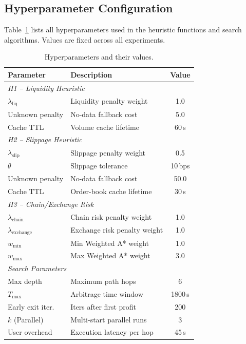 \subsection{Hyperparameter Configuration}
\label{sec:hyperparams}

Table~\ref{tab:hyperparams} lists all hyperparameters used in the heuristic functions and search algorithms. Values are fixed across all experiments.

\begin{table}[h]
\centering
\small
\caption{Hyperparameters and their values.}
\label{tab:hyperparams}
\begin{tabular}{llc}
\toprule
\textbf{Parameter} & \textbf{Description} & \textbf{Value} \\
\midrule
\multicolumn{3}{l}{\textit{H1 -- Liquidity Heuristic}} \\
$\lambda_{\text{liq}}$ & Liquidity penalty weight & 1.0 \\
Unknown penalty & No-data fallback cost & 5.0 \\
Cache TTL & Volume cache lifetime & 60\,s \\
\midrule
\multicolumn{3}{l}{\textit{H2 -- Slippage Heuristic}} \\
$\lambda_{\text{slip}}$ & Slippage penalty weight & 0.5 \\
$\theta$ & Slippage tolerance & 10\,bps \\
Unknown penalty & No-data fallback cost & 50.0 \\
Cache TTL & Order-book cache lifetime & 30\,s \\
\midrule
\multicolumn{3}{l}{\textit{H3 -- Chain/Exchange Risk}} \\
$\lambda_{\text{chain}}$ & Chain risk penalty weight & 1.0 \\
$\lambda_{\text{exchange}}$ & Exchange risk penalty weight & 1.0 \\
$w_{\min}$ & Min Weighted A* weight & 1.0 \\
$w_{\max}$ & Max Weighted A* weight & 3.0 \\
\midrule
\multicolumn{3}{l}{\textit{Search Parameters}} \\
Max depth & Maximum path hops & 6 \\
$T_{\max}$ & Arbitrage time window & 1800\,s \\
Early exit iter. & Iters after first profit & 200 \\
$k$ (Parallel) & Multi-start parallel runs & 3 \\
User overhead & Execution latency per hop & 45\,s \\
\bottomrule
\end{tabular}
\end{table}

